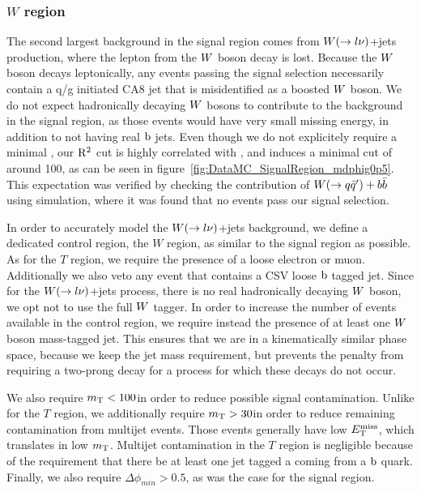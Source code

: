 

\subsubsection{\texorpdfstring{$W$}{W} region}

The second largest background in the signal region comes from $W(\rightarrow l\nu)$+jets
production, where the lepton from the $W$ boson decay is lost.
Because the $W$ boson decays leptonically, any events passing the signal selection necessarily
contain a q/g initiated CA8 jet that is misidentified as a boosted $W$ boson. 
We do not expect hadronically decaying $W$ bosons to contribute to the background in the signal
region, as those events would have very small missing energy, in addition to not having real
$\mathrm{b}$ jets. Even though we do not explicitely require a minimal \ETm, our $\mathrm{R^2}$ cut is highly
correlated with \ETm, and induces a minimal cut of around 100\GeV, as can be seen in
figure~\ref{fig:DataMC_SignalRegion_mdphig0p5}.  
This expectation was verified by checking the contribution of $W(\rightarrow
q\bar{q}')+b\bar{b}$ using simulation, where it was found that no events pass our signal
selection. 

In order to accurately model the $W(\rightarrow l\nu)$+jets background, we define a dedicated
control region, the $W$ region, as similar to the signal region as possible. As for the $T$ region,
we require the presence of a loose electron or muon. Additionally we also veto any event that
contains a CSV loose $\mathrm{b}$ tagged jet.  
Since for the $W(\rightarrow l\nu)$+jets process, there is no real hadronically decaying $W$
boson, we opt not to use the full $W$ tagger. 
In order to increase the number of events available in the control region, we require instead the
presence of at least one $W$ boson mass-tagged jet. This ensures that we are in a kinematically
similar phase space, because we keep the jet mass requirement, but prevents the penalty from
requiring a two-prong decay for a process for which these decays do not occur. 

We also require $m_{\mathrm{T}} < 100$\GeV in order to reduce possible signal contamination. Unlike for the $T$
region, we additionally require $m_{\mathrm{T}} > 30$\GeV in order to reduce remaining contamination from
multijet events. Those events generally have low $E_{\mathrm{T}}^{\text{miss}}$, which translates in low $m_{\mathrm{T}}$. 
Multijet contamination in the $T$ region is negligible because of the
requirement that there be at least one jet tagged a coming from a $\mathrm{b}$ quark. 
Finally, we also require $\Delta\phi_{min} > 0.5$, as was the case for the signal region. 

